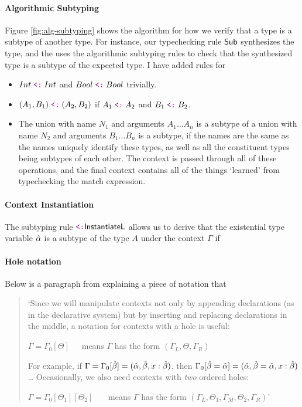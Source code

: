 \paragraph{Algorithmic Subtyping} Figure \ref{fig:alg-subtyping} shows the algorithm for how we verify that a type is a subtype of another type. For instance, our typechecking rule $\text{\normalfont\textsf{Sub}}$ synthesizes the type, and the uses the algorithmic subtyping rules to check that the synthesized type is a subtype of the expected type. I have added rules for
\begin{itemize}
    \item $Int \subtype Int$ and $Bool \subtype Bool$ trivially. 
    \item $(A_1, B_1) \subtype (A_2, B_2)$ if $A_1 \subtype A_2$ and $B_1 \subtype B_2$.
    \item The union with name $N_1$ and arguments $A_1 \dots A_n$ is a subtype of a union with name $N_2$ and arguments $B_1 \dots B_n$ is a subtype, if the names are the same as the names uniquely identify these types, as well as all the constituent types being subtypes of each other. The context is passed through all of these operations, and the final context contains all of the things `learned' from typechecking the match expression.
\end{itemize}

\paragraph{Context Instantiation} 
The subtyping rule $\SubInstL$ allows us to derive that the existential type variable $\hat{\alpha}$ is a subtype of the type $A$ under the context $\Gamma$ if

\pagebreak

% 


\paragraph{Hole notation}
Below is a paragraph from \cite{completebidir} explaining a piece of notation that 
\begin{quote}
`Since we will manipulate contexts not only by appending declarations (as in the declarative
system) but by inserting and replacing declarations in the middle,
a notation for contexts with a hole is useful:
\vspace{-4pt}
\begin{displ}
  $\Gamma = \Gamma_0[\Theta]$~~~means $\Gamma$ has the form $(\Gamma_L, \Theta, \Gamma_R)$
\end{displ}
For example, if $\Gamma = \Gamma_0[\hat{\beta}] = (\hat{\alpha}, \hat{\beta}, x : \hat{\beta})$,
then $\Gamma_0[{\hat{\beta}} = {\hat{\alpha}}] = (\hat{\alpha}, {\hat{\beta}} = {\hat{\alpha}}, x : \hat{\beta})$\newline\dots\newline
Occasionally, we also need contexts with \emph{two} ordered holes:
\begin{displ}
  $\Gamma = \Gamma_0[\Theta_1][\Theta_2]$
  ~~~means
  $\Gamma$ has the form $(\Gamma_L, \Theta_1, \Gamma_M, \Theta_2, \Gamma_R)$' \cite{completebidir}
\end{displ}
\end{quote}

